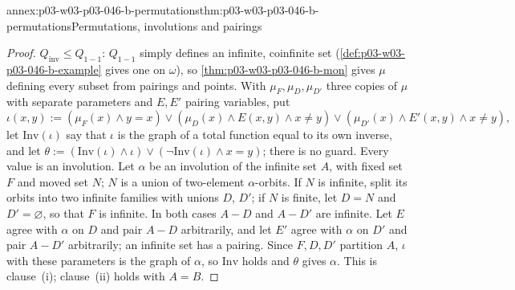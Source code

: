 \begin{annexitem}{annex:p03-w03-p03-046-b-permutations}{thm:p03-w03-p03-046-b-permutations}{Permutations, involutions and pairings}
\begin{proof}
\(Q_{\mathrm{inv}}\le Q_{1-1}\): \(Q_{1-1}\) simply defines an infinite,
coinfinite set (\cref{def:p03-w03-p03-046-b-example} gives one on
\(\omega\)), so \cref{thm:p03-w03-p03-046-b-mon} gives \(\mu\) defining
every subset from pairings and points. With \(\mu_F,\mu_D,\mu_{D'}\)
three copies of \(\mu\) with separate parameters and \(E,E'\) pairing
variables, put
\[
\iota(x,y):=(\mu_F(x)\wedge y=x)\vee(\mu_D(x)\wedge E(x,y)\wedge x\neq y)
\vee(\mu_{D'}(x)\wedge E'(x,y)\wedge x\neq y),
\]
let \(\mathrm{Inv}(\iota)\) say that \(\iota\) is the graph of a total
function equal to its own inverse, and let
\(\theta:=(\mathrm{Inv}(\iota)\wedge\iota)\vee(\neg\mathrm{Inv}(\iota)\wedge
x=y)\); there is no guard. Every value is an involution. Let \(\alpha\) be
an involution of the infinite set \(A\), with fixed set \(F\) and moved
set \(N\); \(N\) is a union of two-element \(\alpha\)-orbits. If \(N\) is
infinite, split its orbits into two infinite families with unions \(D\),
\(D'\); if \(N\) is finite, let \(D=N\) and \(D'=\varnothing\), so that
\(F\) is infinite. In both cases \(A-D\) and \(A-D'\) are infinite. Let
\(E\) agree with \(\alpha\) on \(D\) and pair \(A-D\) arbitrarily, and let
\(E'\) agree with \(\alpha\) on \(D'\) and pair \(A-D'\) arbitrarily; an
infinite set has a pairing. Since \(F,D,D'\) partition \(A\), \(\iota\)
with these parameters is the graph of \(\alpha\), so \(\mathrm{Inv}\)
holds and \(\theta\) gives \(\alpha\). This is clause~(i); clause~(ii)
holds with \(A=B\).
\end{proof}
\end{annexitem}

